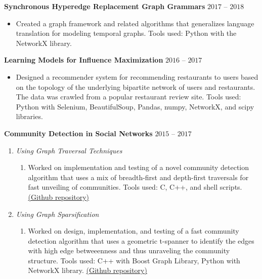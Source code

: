 \documentclass[11pt]{article}
\newenvironment{innerlist}[1][\enskip]%
        {\begin{enumerate}[#1,leftmargin=*,parsep=0pt,itemsep=0pt,topsep=0pt,partopsep=0pt]}
        {\end{enumerate}}
\newenvironment{loneinnerlist}[1][\enskip\textbullet]%
        {\begin{itemize}[#1,leftmargin=*,parsep=0pt,itemsep=0pt,topsep=0pt,partopsep=0pt]}
        {\end{itemize}\vspace{-.6\baselineskip}}
\newcommand{\blankline}{\quad\pagebreak[3]}
\newcommand{\halfblankline}{\quad\vspace{-0.5\baselineskip}\pagebreak[3]}
\begin{document}
\halfblankline

\textbf{Synchronous Hyperedge Replacement Graph Grammars} \hfill $2017$ -- $2018$
\begin{loneinnerlist}
    \item[] Created a graph framework and related algorithms that generalizes language translation for modeling temporal graphs. Tools used: Python with the NetworkX library.
\end{loneinnerlist}

\blankline

\textbf{Learning Models for Influence Maximization} \hfill $2016$ -- $2017$

\begin{loneinnerlist}
    \item[] Designed a recommender system for recommending restaurants to users based on the topology of the underlying bipartite network of users and restaurants. The data was crawled from a popular restaurant review site. Tools used: Python with Selenium, BeautifulSoup, Pandas, numpy, NetworkX, and scipy libraries. 
\end{loneinnerlist}

\vspace*{0.5cm}    
\textbf{Community Detection in Social Networks} \hfill $2015$ -- $2017$
    \begin{innerlist}
        \item[] \textit{Using Graph Traversal Techniques}
        \begin{innerlist}
            \item[] Worked on implementation and testing of a novel community detection algorithm that uses a mix of breadth-first and depth-first traversals for fast unveiling of communities. Tools used: C, C++, and shell scripts.  \href{https://github.com/sna-lincom/LINCOM}{(Github repository)}
        \end{innerlist}   
        \vspace{0.2cm}
        \item[] \textit{Using Graph Sparsification} 
        \begin{innerlist}
            \item[] Worked on design, implementation, and testing of a fast community detection algorithm that uses a geometric t-spanner to identify the edges with high edge betweeenness and thus unraveling the community structure. Tools used: C++ with Boost Graph Library, Python with NetworkX library. \href{https://github.com/satyakisikdar/spanner-comm-detection}{(Github repository)}
        \end{innerlist}
    \end{innerlist}
\end{document}
